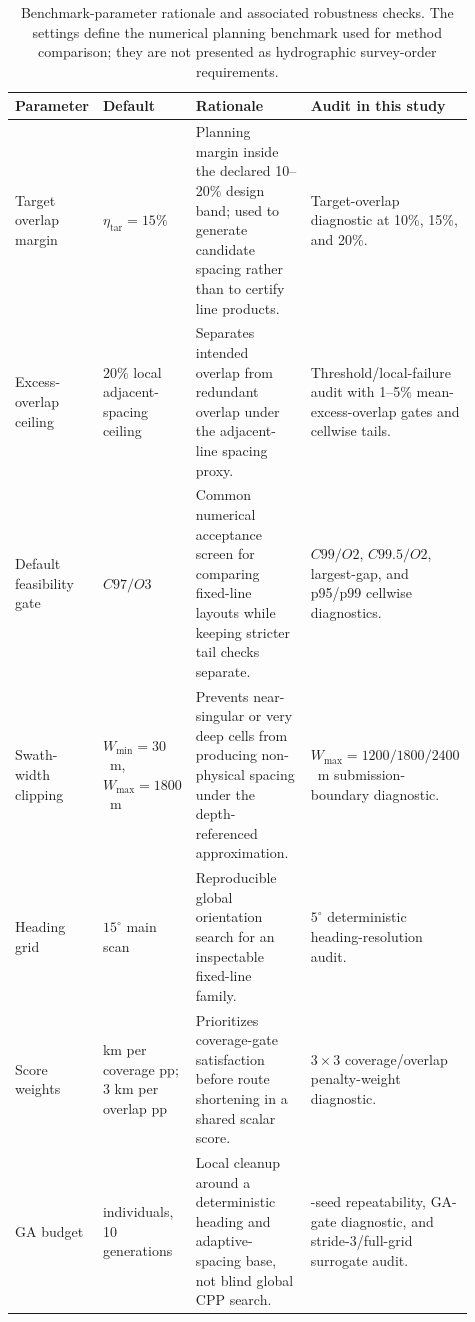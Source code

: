 \documentclass[jmse,article,submit,moreauthors]{Definitions/mdpi}
\begin{document}
\begin{table}[!htbp]
	\centering
	\caption{Benchmark-parameter rationale and associated robustness checks. The settings define the numerical planning benchmark used for method comparison; they are not presented as hydrographic survey-order requirements.}
	\label{tab:parameter_rationale}
	\scriptsize
	\renewcommand{\arraystretch}{1.10}
	\setlength{\tabcolsep}{3.0pt}
	\begin{tabular}{@{}>{\raggedright\arraybackslash}p{0.19\linewidth}>{\raggedright\arraybackslash}p{0.18\linewidth}>{\raggedright\arraybackslash}p{0.34\linewidth}>{\raggedright\arraybackslash}p{0.20\linewidth}@{}}
		\toprule[1bp]
		\textbf{Parameter} & \textbf{Default} & \textbf{Rationale} & \textbf{Audit in this study} \\
		\midrule[1bp]
		Target overlap margin & \(\eta_{\mathrm{tar}}=15\%\) & Planning margin inside the declared 10--20\% design band; used to generate candidate spacing rather than to certify line products. & Target-overlap diagnostic at 10\%, 15\%, and 20\%. \\
		Excess-overlap ceiling & \(20\%\) local adjacent-spacing ceiling & Separates intended overlap from redundant overlap under the adjacent-line spacing proxy. & Threshold/local-failure audit with 1--5\% mean-excess-overlap gates and cellwise tails. \\
		Default feasibility gate & \(C97/O3\) & Common numerical acceptance screen for comparing fixed-line layouts while keeping stricter tail checks separate. & \(C99/O2\), \(C99.5/O2\), largest-gap, and p95/p99 cellwise diagnostics. \\
		Swath-width clipping & \(W_{\min}=30\)~m, \(W_{\max}=1800\)~m & Prevents near-singular or very deep cells from producing non-physical spacing under the depth-referenced approximation. & \(W_{\max}=1200/1800/2400\)~m submission-boundary diagnostic. \\
		Heading grid & \(15^{\circ}\) main scan & Reproducible global orientation search for an inspectable fixed-line family. & \(5^{\circ}\) deterministic heading-resolution audit. \\
		Score weights & 80 km per coverage pp; 3 km per overlap pp & Prioritizes coverage-gate satisfaction before route shortening in a shared scalar score. & \(3\times3\) coverage/overlap penalty-weight diagnostic. \\
		GA budget & 10 individuals, 10 generations & Local cleanup around a deterministic heading and adaptive-spacing base, not blind global CPP search. & 50-seed repeatability, GA-gate diagnostic, and stride-3/full-grid surrogate audit. \\
		\bottomrule[1bp]
	\end{tabular}
\end{table}
\end{document}
